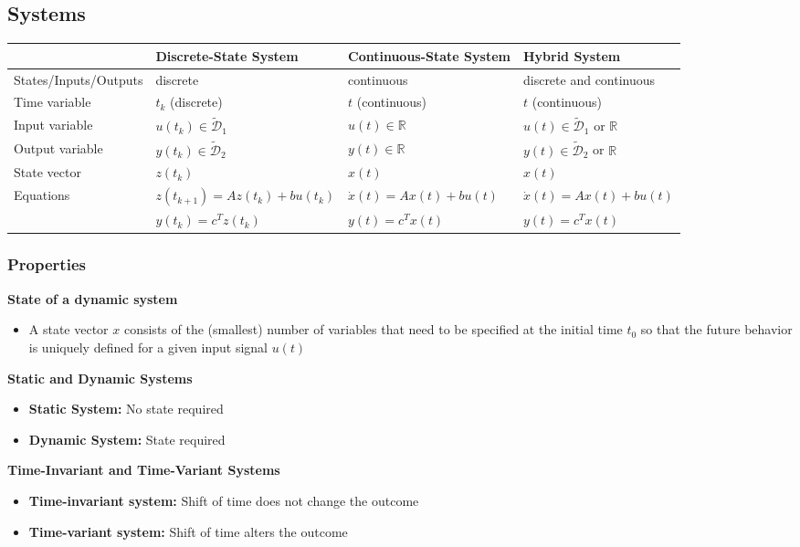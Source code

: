 \documentclass[10pt,a4paper]{article}
\begin{document}
\subsection{Systems}
\begin{tabularx}{\columnwidth}{l|X|X|X}
	& Discrete-State System & Continuous-State System & Hybrid System \\
	\hline
	\hline
	States/Inputs/Outputs & discrete & continuous & discrete and continuous \\
	Time variable & $t_k$ (discrete) & $t$ (continuous) & $t$ (continuous)\\
	Input variable &  $u(t_k) \in \tilde{\mathcal D}_1$ & $u(t) \in \mathbb R$ & $u(t) \in \tilde{\mathcal D}_1$ or $\mathbb R$ \\
	Output variable &  $y(t_k) \in \tilde{\mathcal D}_2$ & $y(t) \in \mathbb R$ & $y(t) \in \tilde{\mathcal D}_2$ or $\mathbb R$ \\
	State vector & $z(t_k)$ & $x(t)$ & $x(t)$ \\
	Equations & $z(t_{k+1}) = A z(t_k) + b u(t_k)$ & $\dot x(t) = A x(t) + b u(t)$ & $\dot x(t) = A x(t) + b u(t)$ \\
	& $y(t_k) = c^T z(t_k)$ & $y(t) = c^T x(t)$ & $y(t) = c^T x(t)$
	
\end{tabularx}

\subsubsection{Properties}


\textbf{State of a dynamic system}
\begin{itemize}
	\item A state vector $x$ consists of the (smallest) number of variables that need to be specified at the initial time $t_0$ so that the future behavior is uniquely defined for a given input signal $u(t)$
\end{itemize}

\textbf{Static and Dynamic Systems}
\begin{itemize}
	\item \textbf{Static System:} No state required
	\item \textbf{Dynamic System:} State required
\end{itemize}

\textbf{Time-Invariant and Time-Variant Systems}
\begin{itemize}
	\item \textbf{Time-invariant system:} Shift of time does not change the outcome
	\item \textbf{Time-variant system:} Shift of time alters the outcome
\end{itemize}
\end{document}
